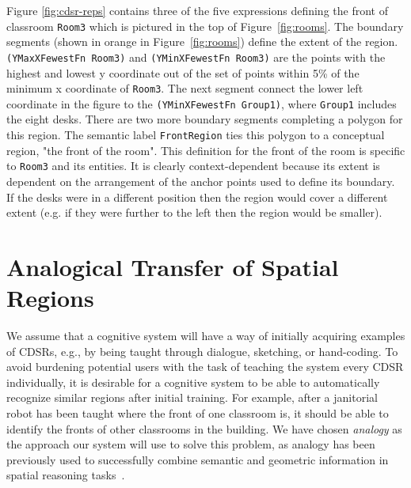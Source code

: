 \documentclass[letterpaper]{article}
\newcommand{\fw}[1]{\texttt{#1}}
\begin{document}
Figure \ref{fig:cdsr-reps} contains three of the five expressions defining the front of classroom \fw{Room3} which is pictured in the top of Figure~\ref{fig:rooms}. The boundary segments (shown in orange in Figure~\ref{fig:rooms}) define the extent of the region. \fw{(YMaxXFewestFn Room3)} and \fw{(YMinXFewestFn Room3)} are the points with the highest and lowest y coordinate out of the set of points within 5\% of the minimum x coordinate of \fw{Room3}. The next segment connect the lower left coordinate in the figure to the \fw{(YMinXFewestFn Group1)}, where \fw{Group1} includes the eight desks. There are two more boundary segments completing a polygon for this region. The semantic label \fw{FrontRegion} ties this polygon to a conceptual region, "the front of the room". This definition for the front of the room is specific to \fw{Room3} and its entities. It is clearly context-dependent because its extent is dependent on the arrangement of the anchor points used to define its boundary. If the desks were in a different position then the region would cover a different extent (e.g. if they were further to the left then the region would be smaller). 



\section{Analogical Transfer of Spatial Regions}\label{sec:analogy}


We assume that a cognitive system will have a way of initially acquiring examples of CDSRs, e.g., by being taught through dialogue, sketching, or hand-coding. To avoid burdening potential users with the task of teaching the system every CDSR individually, it is desirable for a cognitive system to be able to automatically recognize similar regions after initial training. For example, after a janitorial robot has been taught where the front of one classroom is, it should be able to identify the fronts of other classrooms in the building. We have chosen \emph{analogy} as the approach our system will use to solve this problem, as analogy has been previously used to successfully combine semantic and geometric information in spatial reasoning tasks~\cite{Lockwood/etal2008}.
\end{document}
